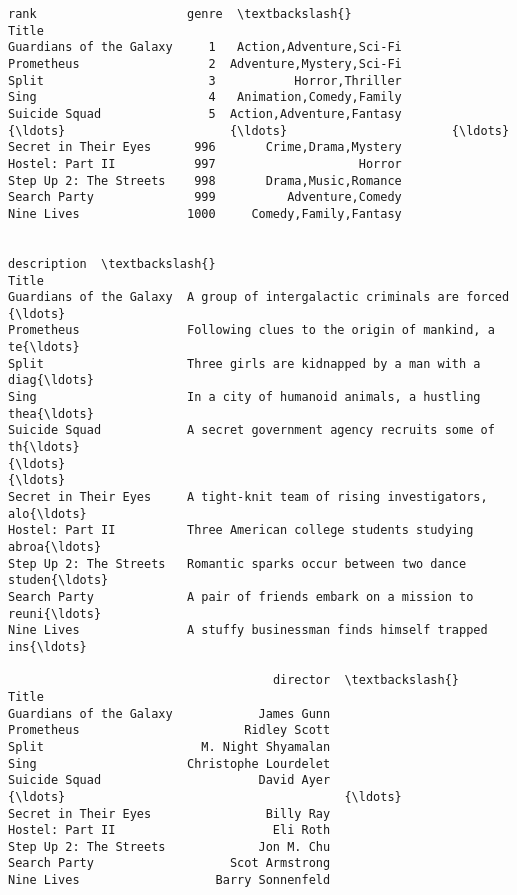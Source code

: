 \documentclass[11pt]{article}
\makeatletter
\newcommand{\boxspacing}{\kern\kvtcb@left@rule\kern\kvtcb@boxsep}
\newcommand{\prompt}[4]{
        {\ttfamily\llap{{\color{#2}[#3]:\hspace{3pt}#4}}\vspace{-\baselineskip}}
    }
\makeatother
\begin{document}
            \begin{tcolorbox}[breakable, size=fbox, boxrule=.5pt, pad at break*=1mm, opacityfill=0]
\prompt{Out}{outcolor}{27}{\boxspacing}
\begin{Verbatim}[commandchars=\\\{\}]
                         rank                     genre  \textbackslash{}
Title
Guardians of the Galaxy     1   Action,Adventure,Sci-Fi
Prometheus                  2  Adventure,Mystery,Sci-Fi
Split                       3           Horror,Thriller
Sing                        4   Animation,Comedy,Family
Suicide Squad               5  Action,Adventure,Fantasy
{\ldots}                       {\ldots}                       {\ldots}
Secret in Their Eyes      996       Crime,Drama,Mystery
Hostel: Part II           997                    Horror
Step Up 2: The Streets    998       Drama,Music,Romance
Search Party              999          Adventure,Comedy
Nine Lives               1000     Comedy,Family,Fantasy

                                                               description  \textbackslash{}
Title
Guardians of the Galaxy  A group of intergalactic criminals are forced {\ldots}
Prometheus               Following clues to the origin of mankind, a te{\ldots}
Split                    Three girls are kidnapped by a man with a diag{\ldots}
Sing                     In a city of humanoid animals, a hustling thea{\ldots}
Suicide Squad            A secret government agency recruits some of th{\ldots}
{\ldots}                                                                    {\ldots}
Secret in Their Eyes     A tight-knit team of rising investigators, alo{\ldots}
Hostel: Part II          Three American college students studying abroa{\ldots}
Step Up 2: The Streets   Romantic sparks occur between two dance studen{\ldots}
Search Party             A pair of friends embark on a mission to reuni{\ldots}
Nine Lives               A stuffy businessman finds himself trapped ins{\ldots}

                                     director  \textbackslash{}
Title
Guardians of the Galaxy            James Gunn
Prometheus                       Ridley Scott
Split                      M. Night Shyamalan
Sing                     Christophe Lourdelet
Suicide Squad                      David Ayer
{\ldots}                                       {\ldots}
Secret in Their Eyes                Billy Ray
Hostel: Part II                      Eli Roth
Step Up 2: The Streets             Jon M. Chu
Search Party                   Scot Armstrong
Nine Lives                   Barry Sonnenfeld


\end{Verbatim}
\end{tcolorbox}
\end{document}
